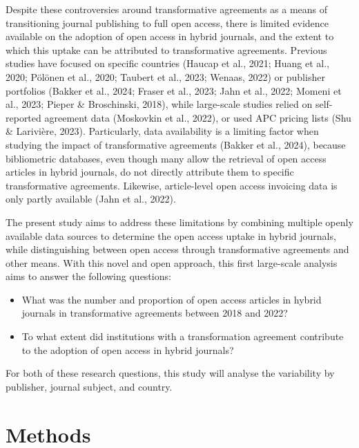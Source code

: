 \documentclass[a4paper,man,floatsintext,longtable,noextraspace,12pt]{apa6}
\providecommand{\tightlist}{%
  \setlength{\itemsep}{0pt}\setlength{\parskip}{0pt}}
\begin{document}
Despite these controversies around transformative agreements as a means
of transitioning journal publishing to full open access, there is
limited evidence available on the adoption of open access in hybrid
journals, and the extent to which this uptake can be attributed to
transformative agreements. Previous studies have focused on specific
countries (Haucap et al., 2021; Huang et al., 2020; Pölönen et al.,
2020; Taubert et al., 2023; Wenaas, 2022) or publisher portfolios
(Bakker et al., 2024; Fraser et al., 2023; Jahn et al., 2022; Momeni et
al., 2023; Pieper \& Broschinski, 2018), while large-scale studies
relied on self-reported agreement data (Moskovkin et al., 2022), or used
APC pricing lists (Shu \& Larivière, 2023). Particularly, data
availability is a limiting factor when studying the impact of
transformative agreements (Bakker et al., 2024), because bibliometric
databases, even though many allow the retrieval of open access articles
in hybrid journals, do not directly attribute them to specific
transformative agreements. Likewise, article-level open access invoicing
data is only partly available (Jahn et al., 2022).

The present study aims to address these limitations by combining
multiple openly available data sources to determine the open access
uptake in hybrid journals, while distinguishing between open access
through transformative agreements and other means. With this novel and
open approach, this first large-scale analysis aims to answer the
following questions:

\begin{itemize}
\tightlist
\item
  What was the number and proportion of open access articles in hybrid
  journals in transformative agreements between 2018 and 2022?
\item
  To what extent did institutions with a transformation agreement
  contribute to the adoption of open access in hybrid journals?
\end{itemize}

For both of these research questions, this study will analyse the
variability by publisher, journal subject, and country.

\hypertarget{methods}{%
\section{Methods}\label{methods}}
\end{document}
